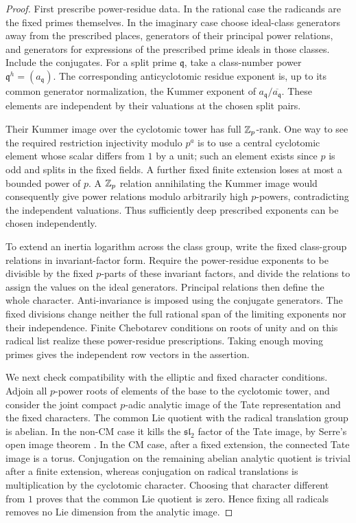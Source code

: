 \begin{proof}
First prescribe power-residue data.  In the rational case the
radicands are the fixed primes themselves.  In the imaginary case
choose ideal-class generators away from the prescribed places,
generators of their principal power relations, and generators for
expressions of the prescribed prime ideals in those classes.  Include
the conjugates.  For a split prime $\mathfrak q$, take a class-number
power $\mathfrak q^h=(a_{\mathfrak q})$.  The corresponding
anticyclotomic residue exponent is, up to its common generator
normalization, the Kummer exponent of
$a_{\mathfrak q}/\overline{a_{\mathfrak q}}$.  These elements are
independent by their valuations at the chosen split pairs.

Their Kummer image over the cyclotomic tower has full $\mathbb Z_p$-rank.
One way to see the required restriction injectivity modulo $p^a$
is to use a central cyclotomic element whose scalar differs from
$1$ by a unit; such an element exists since $p$ is odd and splits
in the fixed fields.  A further fixed finite extension loses at
most a bounded power of $p$.  A $\mathbb Z_p$ relation annihilating the
Kummer image would consequently give power relations modulo
arbitrarily high $p$-powers, contradicting the independent
valuations.  Thus sufficiently deep prescribed exponents can be
chosen independently.

To extend an inertia logarithm across the class group, write the
fixed class-group relations in invariant-factor form.  Require the
power-residue exponents to be divisible by the fixed $p$-parts of
these invariant factors, and divide the relations to assign the
values on the ideal generators.  Principal relations then define
the whole character.  Anti-invariance is imposed using the
conjugate generators.  The fixed divisions change neither the full
rational span of the limiting exponents nor their independence.
Finite Chebotarev conditions on roots of unity and on this radical
list realize these power-residue prescriptions.  Taking enough
moving primes gives the independent row vectors in the assertion.

We next check compatibility with the elliptic and fixed character
conditions.  Adjoin all $p$-power roots of elements of the base to
the cyclotomic tower, and consider the joint compact $p$-adic
analytic image of the Tate representation and the fixed characters.
The common Lie quotient with the radical translation group is
abelian.  In the non-CM case it kills the $\mathfrak{sl}_2$ factor
of the Tate image, by Serre's open image theorem \cite{Serre}.
In the CM case, after a fixed extension, the connected Tate image
is a torus.  Conjugation on the remaining abelian analytic quotient
is trivial after a finite extension, whereas conjugation on radical
translations is multiplication by the cyclotomic character.
Choosing that character different from $1$ proves that the common
Lie quotient is zero.  Hence fixing all radicals removes no Lie
dimension from the analytic image.


\end{proof}
